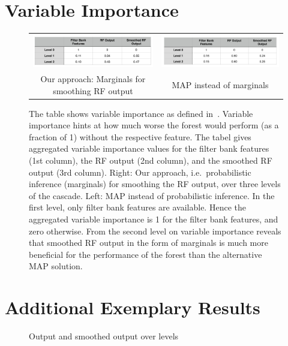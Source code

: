 \documentclass[10pt,twocolumn,letterpaper]{article}
\begin{document}
\section{Variable Importance}
%
\begin{figure}[h!]
\begin{center}
\begin{tabular}{cc}
\includegraphics[width=\columnwidth]{VariableImportance_Ours.jpg} &
\includegraphics[width=\columnwidth]{VariableImportance_MAP.jpg} \\
Our approach: Marginals for smoothing RF output & MAP instead of marginals \\
\end{tabular}
\caption{The table shows variable importance as defined in~\cite{BreimanRF}. Variable importance hints at how much worse the forest would perform (as a fraction of 1) without the respective feature. The tabel gives aggregated variable importance values for the filter bank features (1st column), the RF output (2nd column), and the smoothed RF output (3rd column). Right: Our approach, i.e.\ probabilistic inference (marginals) for smoothing the RF output, over three levels of the cascade. Left: MAP instead of probabilistic inference. In the first level, only filter bank features are available. Hence the aggregated variable importance is 1 for the filter bank features, and zero otherwise. From the second level on variable importance reveals that smoothed RF output in the form of marginals is much more beneficial for the performance of the forest than the alternative MAP solution. }
\label{fig:var-importance}
\end{center}
\end{figure}

\section{Additional Exemplary Results}
%
\begin{figure}[t]
\begin{center}
\caption{Output and smoothed output over levels }
\label{fig:output-over-levels}
\end{center}
\end{figure}

{\small


}
\end{document}
